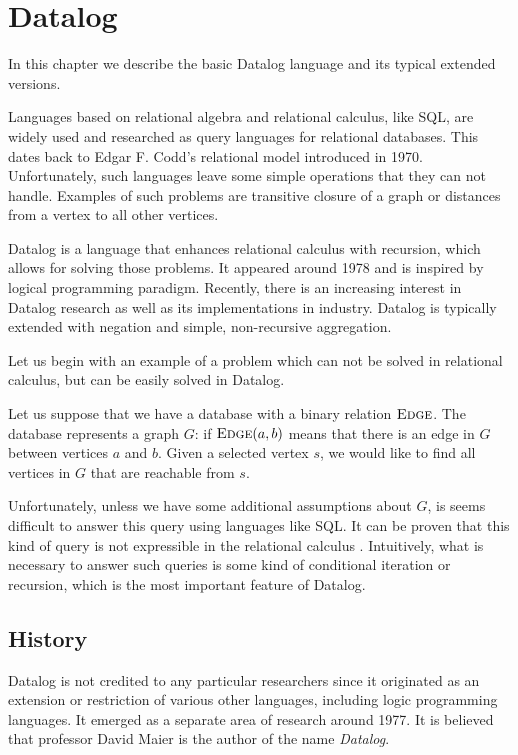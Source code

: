 
\chapter{Datalog}\label{r:datalog}

In this chapter we describe the basic Datalog language and its typical extended versions.

Languages based on relational algebra and relational calculus, like SQL, are widely used and researched as query languages for relational databases. This dates back to Edgar F. Codd's relational model \cite{coddrelmodel} introduced in 1970. Unfortunately, such languages leave some simple operations that they can not handle. Examples of such problems are transitive closure of a graph or distances from a vertex to all other vertices.

Datalog is a language that enhances relational calculus with recursion, which allows for solving those problems. It appeared around 1978 and is inspired by logical programming paradigm. Recently, there is an increasing interest in Datalog research as well as its implementations in industry. Datalog is typically extended with negation and simple, non-recursive aggregation.

Let us begin with an example of a problem which can not be solved in relational calculus, but can be easily solved in Datalog.

Let us suppose that we have a database with a binary relation $\textsc{Edge}$. The database represents a graph $G$: if $\textsc{Edge}(a, b)$ means that there is an edge in $G$ between vertices $a$ and $b$. Given a selected vertex $s$, we would like to find all vertices in $G$ that are reachable from $s$.

Unfortunately, unless we have some additional assumptions about $G$, is seems difficult to answer this query using languages like SQL. It can be proven that this kind of query is not expressible in the relational calculus \cite{fod}. Intuitively, what is necessary to answer such queries is some kind of conditional iteration or recursion, which is the most important feature of Datalog.

\section{History}

Datalog is not credited to any particular researchers since it originated as an extension or restriction of various other languages, including logic programming languages. It emerged as a separate area of research around 1977. It is believed that professor David Maier is the author of the name \emph{Datalog}.

